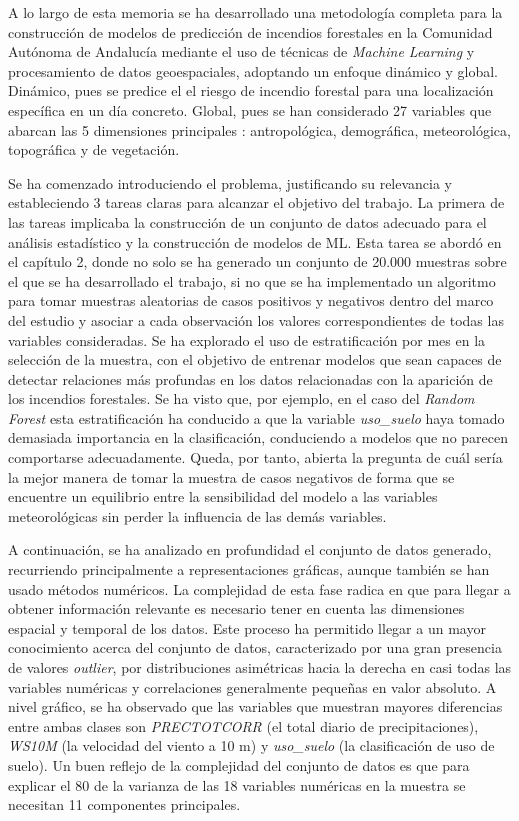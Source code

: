\documentclass[12pt,a4paper,]{book}
\numberwithin{dummy}{section}
\theoremstyle{ocrenumbox}
\theoremstyle{blacknumex}
\theoremstyle{blacknumbox}
\theoremstyle{ocrenum}
\theoremstyle{ocrenum}
\begin{document}
A lo largo de esta memoria se ha desarrollado una metodología completa
para la construcción de modelos de predicción de incendios forestales en
la Comunidad Autónoma de Andalucía mediante el uso de técnicas de
\emph{Machine Learning} y procesamiento de datos geoespaciales,
adoptando un enfoque dinámico y global. Dinámico, pues se predice el el
riesgo de incendio forestal para una localización específica en un día
concreto. Global, pues se han considerado 27 variables que abarcan las 5
dimensiones principales : antropológica, demográfica, meteorológica,
topográfica y de vegetación.

Se ha comenzado introduciendo el problema, justificando su relevancia y
estableciendo 3 tareas claras para alcanzar el objetivo del trabajo. La
primera de las tareas implicaba la construcción de un conjunto de datos
adecuado para el análisis estadístico y la construcción de modelos de
ML. Esta tarea se abordó en el capítulo 2, donde no solo se ha generado
un conjunto de 20.000 muestras sobre el que se ha desarrollado el
trabajo, si no que se ha implementado un algoritmo para tomar muestras
aleatorias de casos positivos y negativos dentro del marco del estudio y
asociar a cada observación los valores correspondientes de todas las
variables consideradas. Se ha explorado el uso de estratificación por
mes en la selección de la muestra, con el objetivo de entrenar modelos
que sean capaces de detectar relaciones más profundas en los datos
relacionadas con la aparición de los incendios forestales. Se ha visto
que, por ejemplo, en el caso del \emph{Random Forest} esta
estratificación ha conducido a que la variable \emph{uso\_suelo} haya
tomado demasiada importancia en la clasificación, conduciendo a modelos
que no parecen comportarse adecuadamente. \textbar\textbar\textbar{}
Queda, por tanto, abierta la pregunta de cuál sería la mejor manera de
tomar la muestra de casos negativos de forma que se encuentre un
equilibrio entre la sensibilidad del modelo a las variables
meteorológicas sin perder la influencia de las demás variables.
\textbar\textbar\textbar{}

A continuación, se ha analizado en profundidad el conjunto de datos
generado, recurriendo principalmente a representaciones gráficas, aunque
también se han usado métodos numéricos. La complejidad de esta fase
radica en que para llegar a obtener información relevante es necesario
tener en cuenta las dimensiones espacial y temporal de los datos. Este
proceso ha permitido llegar a un mayor conocimiento acerca del conjunto
de datos, caracterizado por una gran presencia de valores
\emph{outlier}, por distribuciones asimétricas hacia la derecha en casi
todas las variables numéricas y correlaciones generalmente pequeñas en
valor absoluto. A nivel gráfico, se ha observado que las variables que
muestran mayores diferencias entre ambas clases son \emph{PRECTOTCORR}
(el total diario de precipitaciones), \emph{WS10M} (la velocidad del
viento a 10 m) y \emph{uso\_suelo} (la clasificación de uso de suelo).
Un buen reflejo de la complejidad del conjunto de datos es que para
explicar el \(80%
\) de la varianza de las 18 variables numéricas en la muestra se
necesitan 11 componentes principales.
\end{document}
